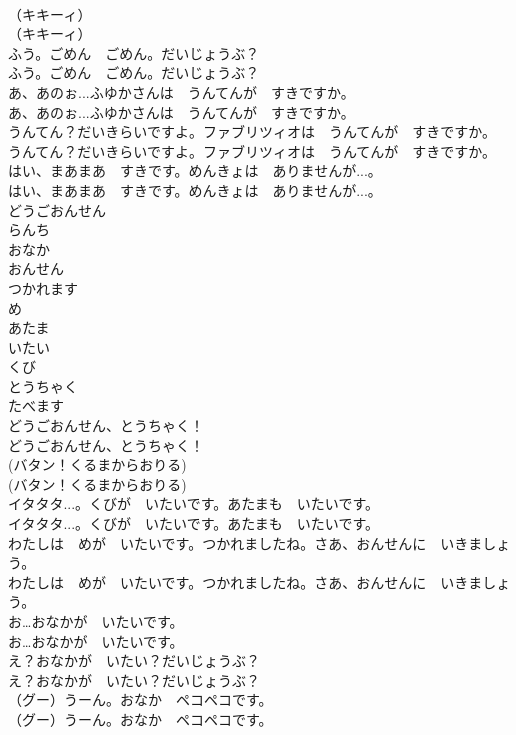 \documentclass[8pt]{extreport}
\begin{document}
\begin{CJK}{UTF8}{min}
\\	（キキーィ）	
\\	（キキーィ） 
\\	ふう。ごめん　ごめん。だいじょうぶ？	
\\	ふう。ごめん　ごめん。だいじょうぶ？ 
\\	あ、あのぉ...ふゆかさんは　うんてんが　すきですか。	
\\	あ、あのぉ...ふゆかさんは　うんてんが　すきですか。 
\\	うんてん？だいきらいですよ。ファブリツィオは　うんてんが　すきですか。	
\\	うんてん？だいきらいですよ。ファブリツィオは　うんてんが　すきですか。 
\\	はい、まあまあ　すきです。めんきょは　ありませんが...。	
\\	はい、まあまあ　すきです。めんきょは　ありませんが...。 
\\	どうごおんせん
\\	らんち
\\	おなか
\\	おんせん
\\	つかれます
\\	め
\\	あたま
\\	いたい
\\	くび
\\	とうちゃく
\\	たべます
\\	どうごおんせん、とうちゃく！	
\\	どうごおんせん、とうちゃく！ 
\\	(バタン！くるまからおりる)	
\\	(バタン！くるまからおりる) 
\\	イタタタ...。くびが　いたいです。あたまも　いたいです。	
\\	イタタタ...。くびが　いたいです。あたまも　いたいです。 
\\	わたしは　めが　いたいです。つかれましたね。さあ、おんせんに　いきましょう。	
\\	わたしは　めが　いたいです。つかれましたね。さあ、おんせんに　いきましょう。 
\\	お…おなかが　いたいです。	
\\	お…おなかが　いたいです。 
\\	え？おなかが　いたい？だいじょうぶ？	
\\	え？おなかが　いたい？だいじょうぶ？ 
\\	（グー）うーん。おなか　ペコペコです。	
\\	（グー）うーん。おなか　ペコペコです。 

\end{CJK}
\end{document}
